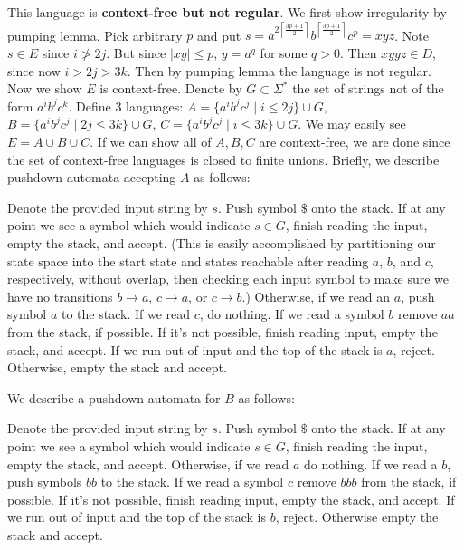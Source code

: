 \documentclass{article}
\newenvironment{myindentpar}[1]
  {\begin{list}{}
          {\setlength{\leftmargin}{#1}
          \setlength{\rightmargin}{#1}}
          \item[]
  }
  {\end{list}}
\begin{document}
\subsection{}
This language is \textbf{context-free but not regular}. We first show irregularity by pumping lemma. Pick arbitrary $p$ and put $s = a^{2\left\lceil \frac{3p+1}{2} \right\rceil}b^{\left\lceil \frac{3p+1}{2} \right\rceil}c^p = xyz$. Note $s \in E$ since $i \not> 2j$. But since $|xy| \leqslant p$, $y = a^q$ for some $q > 0$. Then $xyyz \in D$, since now $i > 2j > 3k$. Then by pumping lemma the language is not regular. \\
Now we show $E$ is context-free. Denote by $G \subset \Sigma^*$ the set of strings not of the form $a^ib^jc^k$. Define 3 languages: $A = \{a^ib^jc^j \;|\; i \leqslant 2j \} \cup G$, $B = \{a^ib^jc^j \;|\; 2j \leqslant 3k \} \cup G$, $C = \{a^ib^jc^j \;|\; i \leqslant 3k \} \cup G$. We may easily see $E = A \cup B \cup C$. If we can show all of $A,B,C$ are context-free, we are done since the set of context-free languages is closed to finite unions. Briefly, we describe pushdown automata accepting $A$ as follows:
\begin{myindentpar}{1em}
Denote the provided input string by $s$. Push symbol $\$$ onto the stack. If at any point we see a symbol which would indicate $s \in G$, finish reading the input, empty the stack, and accept. (This is easily accomplished by partitioning our state space into the start state and states reachable after reading $a$, $b$, and $c$, respectively, without overlap, then checking each input symbol to make sure we have no transitions $b \to a$, $c \to a$, or $c \to b$.) Otherwise, if we read an $a$, push symbol $a$ to the stack. If we read $c$, do nothing. If we read a symbol $b$ remove $aa$ from the stack, if possible. If it's not possible, finish reading input, empty the stack, and accept. If we run out of input and the top of the stack is $a$, reject. Otherwise, empty the stack and accept.
\end{myindentpar}
We describe a pushdown automata for $B$ as follows:
\begin{myindentpar}{1em}
Denote the provided input string by $s$. Push symbol $\$$ onto the stack. If at any point we see a symbol which would indicate $s \in G$, finish reading the input, empty the stack, and accept. Otherwise, if we read $a$ do nothing. If we read a $b$, push symbols $bb$ to the stack. If we read a symbol $c$ remove $bbb$ from the stack, if possible. If it's not possible, finish reading input, empty the stack, and accept. If we run out of input and the top of the stack is $b$, reject. Otherwise empty the stack and accept.
\end{myindentpar}
\end{document}
